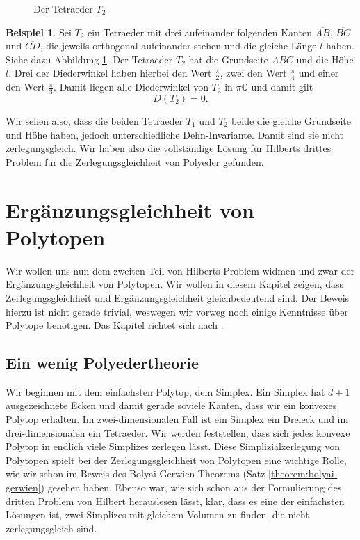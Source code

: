 \documentclass[11pt,titlepage]{article}
\newcommand{\setQ}{\mathbb{Q}}
\theoremstyle{definition}
\newtheorem{example}[theorem]{Beispiel}
\theoremstyle{remark}
\begin{document}
\begin{figure}[!htbp]
\begin{minipage}[m]{0.4\textwidth}
			\caption{Der Tetraeder $T_2$}
			\label{Abb.6}
		\end{minipage}
	\end{figure}

	\begin{example}
		Sei $T_2$ ein Tetraeder mit drei aufeinander folgenden Kanten 
		$\overline{AB}$, $\overline{BC}$ und $\overline{CD}$, die jeweils 
		orthogonal aufeinander stehen und die gleiche Länge $l$ haben. 
		Siehe dazu Abbildung \ref{Abb.6}. 
		Der Tetraeder $T_2$ hat die Grundseite $ABC$ und die Höhe $l$. 
		Drei der Diederwinkel haben hierbei den Wert $\frac{\pi}{2}$, 
		zwei den Wert $\frac{\pi}{4}$ und einer den Wert $\frac{\pi}{3}$. 
		Damit liegen alle Diederwinkel von $T_2$ in $\pi\setQ$ und damit 
		gilt 
		\[D(T_2)=0.\]
	\end{example}
	
	
	
	Wir sehen also, dass die beiden Tetraeder $T_1$ und $T_2$ beide die 
	gleiche Grundseite und Höhe haben, jedoch unterschiedliche Dehn-Invariante. 
	Damit sind sie nicht zerlegungsgleich. Wir haben also die vollständige 
	Lösung für Hilberts drittes Problem für die Zerlegungsgleichheit von 
	Polyeder gefunden.
	
	\newpage
	
	\section{Ergänzungsgleichheit von Polytopen}
	
	Wir wollen uns nun dem zweiten Teil von Hilberts Problem widmen und zwar der 
	Ergänzungsgleichheit von Polytopen. Wir wollen in diesem Kapitel zeigen, dass 
	Zerlegungsgleichheit und Ergänzungsgleichheit gleichbedeutend sind. Der 
	Beweis hierzu ist nicht gerade trivial, weswegen wir vorweg noch einige 
	Kenntnisse über Polytope benötigen. Das Kapitel richtet sich nach 
	\cite{Hadwiger}. 
	
	\subsection{Ein wenig Polyedertheorie}
	
	Wir beginnen mit dem einfachsten Polytop, dem Simplex. Ein Simplex hat 
	$d+1$ ausgezeichnete Ecken und damit gerade soviele Kanten, dass 
	wir ein konvexes Polytop erhalten. Im zwei-dimensionalen Fall ist ein 
	Simplex ein Dreieck und im drei-dimensionalen ein Tetraeder. Wir werden 
	feststellen, dass sich jedes konvexe Polytop in endlich viele Simplizes 
	zerlegen lässt. Diese Simplizialzerlegung von Polytopen spielt bei 
	der Zerlegungsgleichheit von Polytopen eine wichtige Rolle, wie wir schon im 
	Beweis des Bolyai-Gerwien-Theorems (Satz \ref{theorem:bolyai-gerwien}) 
	gesehen haben. Ebenso war, wie sich schon aus der Formulierung des dritten Problem von Hilbert herauslesen lässt, klar, dass es eine der einfachsten Lösungen ist, zwei Simplizes mit gleichem Volumen zu finden, die nicht zerlegungsgleich sind.
	
\end{document}

